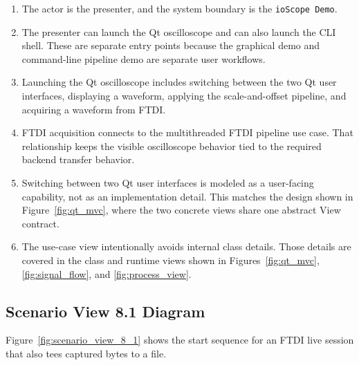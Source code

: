 \begin{enumerate}
    \item The actor is the presenter, and the system boundary is the \texttt{ioScope Demo}.
    \item The presenter can launch the Qt oscilloscope and can also launch the CLI shell. These are separate entry points because the graphical demo and command-line pipeline demo are separate user workflows.
    \item Launching the Qt oscilloscope includes switching between the two Qt user interfaces, displaying a waveform, applying the scale-and-offset pipeline, and acquiring a waveform from FTDI.
    \item FTDI acquisition connects to the multithreaded FTDI pipeline use case. That relationship keeps the visible oscilloscope behavior tied to the required backend transfer behavior.
    \item Switching between two Qt user interfaces is modeled as a user-facing capability, not as an implementation detail. This matches the design shown in Figure~\ref{fig:qt_mvc}, where the two concrete views share one abstract View contract.
    \item The use-case view intentionally avoids internal class details. Those details are covered in the class and runtime views shown in Figures~\ref{fig:qt_mvc}, \ref{fig:signal_flow}, and \ref{fig:process_view}.
\end{enumerate}

\subsection{Scenario View 8.1 Diagram}
\label{Section::Scenario View 8.1 Diagram}


Figure~\ref{fig:scenario_view_8_1} shows the start sequence for an FTDI live session that also tees captured bytes to a file.

